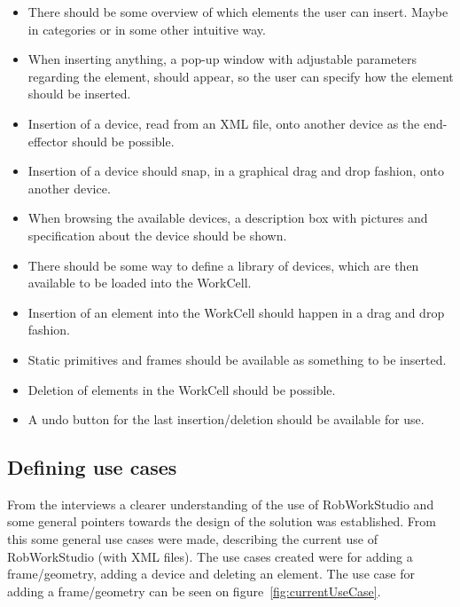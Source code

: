 \begin{itemize}
\item There should be some overview of which elements the user can insert. Maybe in categories or in some other intuitive way.
\item When inserting anything, a pop-up window with adjustable parameters regarding the element, should appear, so the user can specify how the element should be inserted.
\item Insertion of a device, read from an XML file, onto another device as the end-effector should be possible.
\item Insertion of a device should snap, in a graphical drag and drop fashion, onto another device.
\item When browsing the available devices, a description box with pictures and specification about the device should be shown.
\item There should be some way to define a library of devices, which are then available to be loaded into the WorkCell.
\item Insertion of an element into the WorkCell should happen in a drag and drop fashion.
\item Static primitives and frames should be available as something to be inserted.
\item Deletion of elements in the WorkCell should be possible.
\item A undo button for the last insertion/deletion should be available for use.
\end{itemize}

\subsection{Defining use cases}
From the interviews a clearer understanding of the use of RobWorkStudio and some general pointers towards the design of the solution was established. From this some general use cases were made, describing the current use of RobWorkStudio (with XML files). The use cases created were for adding a frame/geometry, adding a device and deleting an element. The use case for adding a frame/geometry can be seen on figure~\ref{fig:currentUseCase}.


